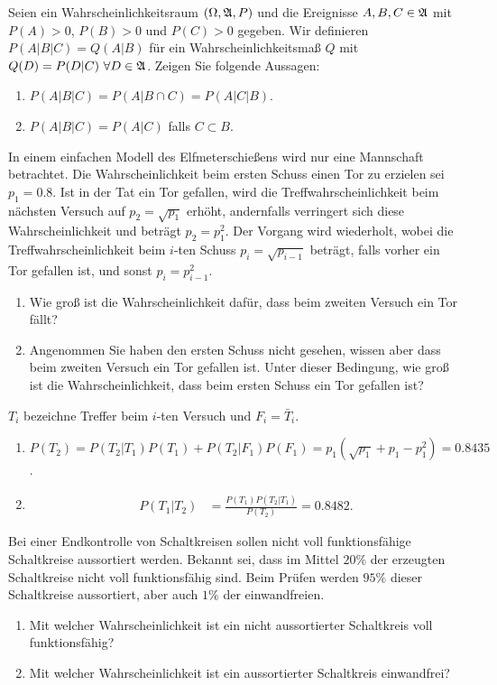 Seien ein Wahrscheinlichkeitsraum $(\Omega, \mathfrak A, P)$ und die Ereignisse
$A,B,C\in\mathfrak A$ mit $P(A)>0$, $P(B)>0$ und $P(C)>0$ gegeben. Wir definieren
$P(A|B|C)= Q(A|B)$ für ein Wahrscheinlichkeitsmaß $Q$ mit $Q(D)=P(D|C) \ \forall
D\in\mathfrak A$. Zeigen Sie folgende Aussagen:
\begin{enumerate}
    \item $P(A|B|C) = P(A| B \cap C) = P(A|C|B)$. 
    \item $P(A|B|C) = P(A| C)$ falls $C \subset B$.
\end{enumerate}


  In einem einfachen Modell des Elfmeterschießens
wird nur eine Mannschaft betrachtet. Die Wahrscheinlichkeit beim ersten Schuss
einen Tor zu erzielen sei $p_{1}=0.8$. Ist in der Tat ein Tor gefallen, wird
die Treffwahrscheinlichkeit beim nächsten Versuch auf $p_2 = \sqrt{p_1}$
erhöht, andernfalls verringert sich diese Wahrscheinlichkeit und beträgt $p_2 =
p_{1}^{2}$. Der Vorgang wird wiederholt, wobei die Treffwahrscheinlichkeit beim
$i$-ten Schuss $p_{i}=\sqrt{p_{i-1}}$ beträgt, falls vorher ein Tor
gefallen ist, und sonst $p_i = p^{2}_{i-1}$.
\begin{enumerate}
    \item Wie groß ist die Wahrscheinlichkeit dafür, dass beim zweiten Versuch
        ein Tor fällt?

    \item Angenommen Sie haben den ersten Schuss nicht gesehen, wissen aber
        dass beim zweiten Versuch ein Tor gefallen ist. Unter dieser Bedingung,
        wie groß ist die Wahrscheinlichkeit, dass beim ersten Schuss ein Tor
        gefallen ist?
\end{enumerate}

\solution
$T_i$ bezeichne Treffer beim $i$-ten Versuch und $F_i = \bar T_i$. 
\begin{enumerate}
    \item $P(T_2) = P( T_2 | T_1) P(T_1) + P(T_2 | F_1) P(F_1) 
        = p_1(\sqrt{p_1}+p_1 -p_1^2) = 0.8435$.
    \item 
        \begin{align*}
            P( T_1 | T_2) &= \frac{ P(T_1) P( T_2 | T_1 )}{P(T_2)} = 0.8482.
        \end{align*}
\end{enumerate}


 Bei einer Endkontrolle von
Schaltkreisen sollen nicht voll funktionsfähige Schaltkreise aussortiert
werden. Bekannt sei, dass im Mittel $20\%$ der erzeugten Schaltkreise nicht
voll funktionsfähig sind. Beim Prüfen werden $95\%$ dieser Schaltkreise
aussortiert, aber auch $1\%$ der einwandfreien.
\begin{enumerate}
    \item Mit welcher Wahrscheinlichkeit ist ein nicht aussortierter
        Schaltkreis voll funktionsfähig?
    \item Mit welcher Wahrscheinlichkeit ist ein aussortierter Schaltkreis
        einwandfrei?
\end{enumerate}


